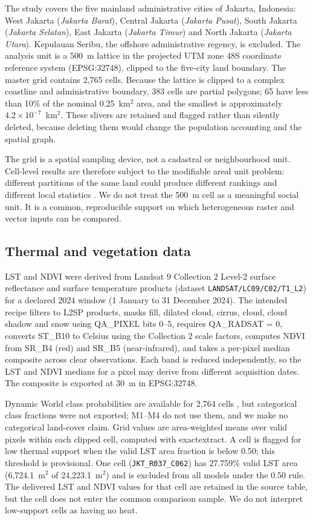 \documentclass[times,twoside]{_Templates/MultiTargetManuscript}
\begin{document}
The study covers the five mainland administrative cities of Jakarta, Indonesia:
West Jakarta (\textit{Jakarta Barat}), Central Jakarta (\textit{Jakarta Pusat}),
South Jakarta (\textit{Jakarta Selatan}), East Jakarta (\textit{Jakarta Timur})
and North Jakarta (\textit{Jakarta Utara}). Kepulauan Seribu, the offshore
administrative regency, is excluded. The analysis unit is a 500~m lattice in the
projected UTM zone 48S coordinate reference system (EPSG:32748), clipped to the
five-city land boundary. The master grid contains 2,765 cells. Because the
lattice is clipped to a complex coastline and administrative boundary, 383 cells
are partial polygons; 65 have less than 10\% of the nominal 0.25~km$^2$ area, and
the smallest is approximately $4.2\times10^{-7}$~km$^2$. These slivers are
retained and flagged rather than silently deleted, because deleting them would
change the population accounting and the spatial graph.

The grid is a spatial sampling device, not a cadastral or neighbourhood unit.
Cell-level results are therefore subject to the modifiable areal unit problem:
different partitions of the same land could produce different rankings and
different local statistics \citep{openshaw1984}. We do not treat the 500~m cell
as a meaningful social unit. It is a common, reproducible support on which
heterogeneous raster and vector inputs can be compared.

\subsection{Thermal and vegetation data}

LST and NDVI were derived from Landsat 9 Collection 2 Level-2 surface
reflectance and surface temperature products (dataset
\texttt{LANDSAT/LC09/C02/T1\_L2}) \citep{usgs2020} for a declared 2024 window
(1 January to 31 December 2024). The intended recipe filters to L2SP products, masks fill,
dilated cloud, cirrus, cloud, cloud shadow and snow using QA\_PIXEL bits 0--5,
requires QA\_RADSAT = 0, converts ST\_B10 to Celsius using the Collection 2
scale factors, computes NDVI from SR\_B4 (red) and SR\_B5 (near-infrared), and
takes a per-pixel median composite across clear observations. Each band is
reduced independently, so the LST and NDVI medians for a pixel may derive from
different acquisition dates. The composite is exported at 30~m in EPSG:32748.

Dynamic World class probabilities are available for 2,764 cells
\citep{brown2022}, but categorical class fractions were not exported; M1--M4 do
not use them, and we make no categorical land-cover claim.
Grid values are area-weighted means over valid pixels within each clipped cell,
computed with exactextract. A cell is flagged for low thermal support when the
valid LST area fraction is below 0.50; this threshold is provisional. One cell
(\texttt{JKT\_R037\_C062}) has 27.759\% valid LST area (6,724.1~m$^2$ of
24,223.1~m$^2$) and is excluded from all models under the 0.50 rule. The
delivered LST and NDVI values for that cell are retained in the source table, but
the cell does not enter the common comparison sample. We do not interpret
low-support cells as having no heat.
\end{document}
